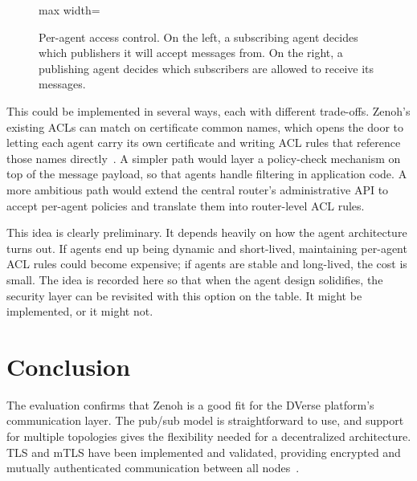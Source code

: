 \documentclass[11pt,a4paper]{article}
\begin{document}
\begin{figure}[H]
\begin{adjustbox}{max width=\textwidth}
  \end{adjustbox}
  \caption{Per-agent access control. On the left, a subscribing agent
    decides which publishers it will accept messages from. On the
    right, a publishing agent decides which subscribers are allowed to
  receive its messages.}
  \label{fig:peragent-acl}
\end{figure}

This could be implemented in several ways, each with different
trade-offs. Zenoh's existing ACLs can match on certificate common
names, which opens the door to letting each agent carry its own
certificate and writing ACL rules that reference those names
directly~\citep{zenoh-acl,zenoh-firesong}. A simpler path would layer
a policy-check mechanism on top of the message payload, so that
agents handle filtering in application code. A more ambitious path
would extend the central router's administrative API to accept
per-agent policies and translate them into router-level ACL rules.

This idea is clearly preliminary. It depends heavily on how the agent
architecture turns out. If agents end up being dynamic and
short-lived, maintaining per-agent ACL rules could become expensive;
if agents are stable and long-lived, the cost is small. The idea is
recorded here so that when the agent design solidifies, the security
layer can be revisited with this option on the table. It might be
implemented, or it might not.

\section{Conclusion}

The evaluation confirms that Zenoh is a good fit for the DVerse
platform's communication layer. The pub/sub model is straightforward
to use, and support for multiple topologies gives the flexibility
needed for a decentralized architecture. TLS and mTLS have been
implemented and validated, providing encrypted and mutually
authenticated communication between all nodes~\citep{zenoh-tls}.
\end{document}
